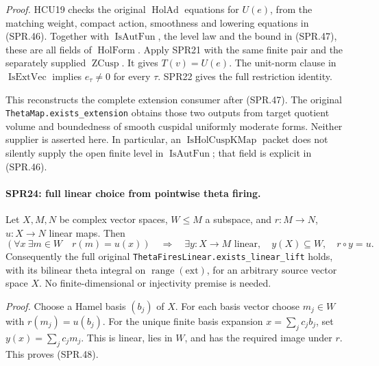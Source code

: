 \emph{Proof.}
HCU19 checks the original \(\operatorname{HolAd}\) equations
for \(U(e)\), from the matching weight, compact action,
smoothness and lowering equations in (SPR.46).
Together with \(\operatorname{IsAutFun}\), the level law and
the bound in (SPR.47), these are all fields of
\(\operatorname{HolForm}\).  Apply SPR21 with the same finite
pair and the separately supplied \(\operatorname{ZCusp}\).
It gives \(T(v)=U(e)\).  The unit-norm clause in
\(\operatorname{IsExtVec}\) implies \(e_\tau\ne0\) for every
\(\tau\).  SPR22 gives the full restriction identity.

This reconstructs the complete extension consumer after
(SPR.47).  The original \texttt{ThetaMap.\allowbreak exists\_\allowbreak extension}
obtains those two outputs from target quotient volume and
boundedness of smooth cuspidal uniformly moderate forms.
Neither supplier is asserted here.  In particular, an
\(\operatorname{IsHolCuspKMap}\) packet does not silently supply
the open finite level in \(\operatorname{IsAutFun}\); that field
is explicit in (SPR.46).

\paragraph{SPR24: full linear choice from pointwise theta firing.}
\label{claim:SPR24}
Let \(X,M,N\) be complex vector spaces, \(W\le M\) a subspace,
and \(r:M\to N\), \(u:X\to N\) linear maps.  Then
\[
 (\forall x\ \exists m\in W\quad r(m)=u(x))
 \quad\Longrightarrow\quad
 \exists y:X\to M\text{ linear},\quad
 y(X)\subseteq W,\quad r\circ y=u.
 \tag{SPR.48}
\]
Consequently the full original
\texttt{ThetaFiresLinear.\allowbreak exists\_\allowbreak linear\_\allowbreak lift} holds, with its
bilinear theta integral on \(\operatorname{range}(\mathrm{ext})\),
for an arbitrary source vector space \(X\).  No finite-dimensional
or injectivity premise is needed.

\emph{Proof.}
Choose a Hamel basis \((b_j)\) of \(X\).  For each basis vector
choose \(m_j\in W\) with \(r(m_j)=u(b_j)\).
For the unique finite basis expansion \(x=\sum_jc_jb_j\), set
\(y(x)=\sum_jc_jm_j\).  This is linear, lies in \(W\), and
has the required image under \(r\).  This proves (SPR.48).

